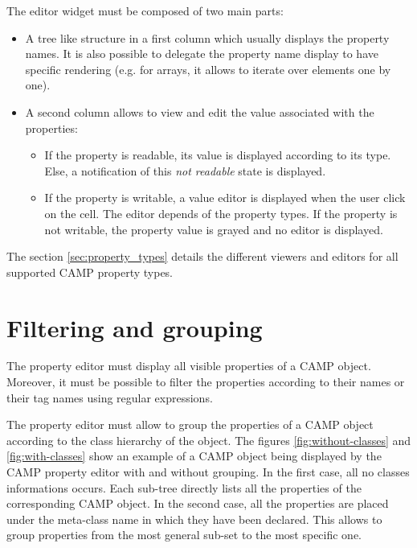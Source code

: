 \documentclass[a4paper, twoside]{report}
\begin{document}
The editor widget must be composed of two main parts:
\begin{itemize}
    \item A tree like structure in a first column which usually displays the property names. It is
also possible to delegate the property name display to have specific rendering (e.g. for arrays, it
allows to iterate over elements one by one).
    \item A second column allows to view and edit the value associated with the properties:
    \begin{itemize}
        \item If the property is readable, its value is displayed according to its type. Else, a
notification of this \emph{not readable} state is displayed.
        \item If the property is writable, a value editor is displayed when the user click on the
cell. The editor depends of the property types. If the property is not writable, the property value
is grayed and no editor is displayed.
    \end{itemize}
\end{itemize}

The section \ref{sec:property_types} details the different viewers and editors for all supported
CAMP property types.

\section{Filtering and grouping}

The property editor must display all visible properties of a CAMP object. Moreover, it must be possible
to filter the properties according to their names or their tag names using regular expressions.

The property editor must allow to group the properties of a CAMP object according to the class
hierarchy of the object. The figures \ref{fig:without-classes} and \ref{fig:with-classes} show an
example of a CAMP object being displayed by the CAMP property editor with and without grouping. In
the first case, all no classes informations occurs. Each sub-tree directly lists all the properties of the
corresponding CAMP object. In the second case, all the properties are placed under the meta-class
name in which they have been declared. This allows to group properties from the most general sub-set to the
most specific one.

\end{document}
